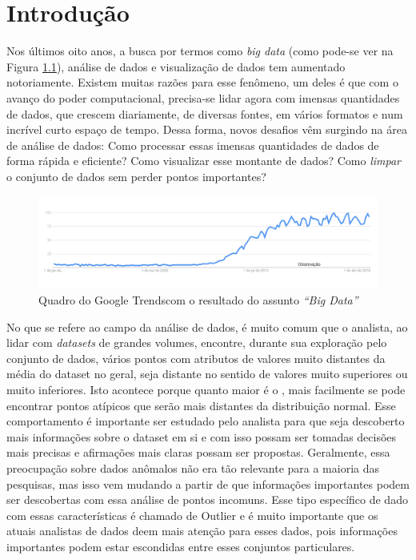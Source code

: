 \chapter{Introdução}
\label{chap:introducao}

Nos últimos oito anos, a busca por termos como \textit{big data} (como pode-se ver na Figura \ref{fig:google-trend}), análise de dados e visualização de dados tem aumentado notoriamente. Existem muitas razões para esse fenômeno, um deles é que com o avanço do poder computacional, precisa-se lidar agora com imensas quantidades de dados, que crescem diariamente, de diversas fontes, em vários formatos e num incrível curto espaço de tempo. Dessa forma, novos desafios vêm surgindo na área de análise de dados: Como processar essas imensas quantidades de dados de forma rápida e eficiente? Como visualizar esse montante de dados? Como \textit{limpar} o conjunto de dados sem perder pontos importantes?

\begin{figure}[!h]
	\centering
	\includegraphics[width=\textwidth]{images/google-trend-big-data.png}
	\caption[Quadro do Google Trends com o resultado do assunto \textit{``Big Data''}]{Quadro do Google Trends\footnotemark \text{ }com o resultado do assunto \textit{``Big Data''}}
	\label{fig:google-trend}
	\vspace{-10pt}
\end{figure}


No que se refere ao campo da análise de dados, é muito comum que o analista, ao lidar com \textit{datasets} de grandes volumes, encontre, durante sua exploração pelo conjunto de dados, vários pontos com atributos de valores muito distantes da média do dataset no geral, seja distante no sentido de valores muito superiores ou muito inferiores. Isto acontece porque quanto maior é o , mais facilmente se pode encontrar pontos atípicos que serão mais distantes da distribuição normal. Esse comportamento é importante ser estudado pelo analista para que seja descoberto mais informações sobre o dataset em si e com isso possam ser tomadas decisões mais precisas e afirmações mais claras possam ser propostas. Geralmente, essa preocupação sobre dados anômalos não era tão relevante para a maioria das pesquisas, mas isso vem mudando a partir de que informações importantes podem ser descobertas com essa análise de pontos incomuns. Esse tipo específico de dado com essas características é chamado de Outlier e é muito importante que os atuais analistas de dados deem mais atenção para esses dados, pois informações importantes podem estar escondidas entre esses conjuntos particulares.

